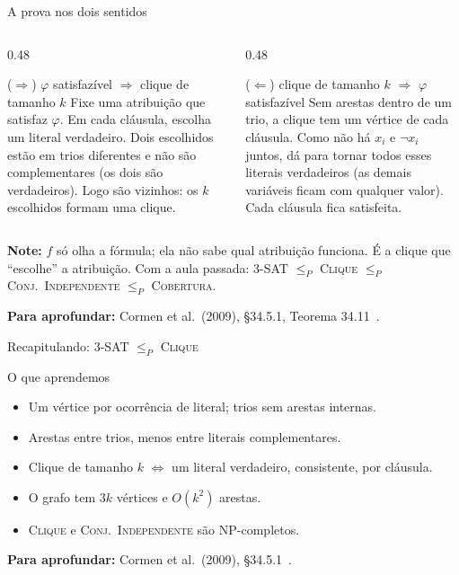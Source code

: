 \documentclass[aspectratio=169,xcolor=table]{beamer}
\newcommand{\fonte}[1]{%
  \vfill
  {\tiny\color{gray!55!black}\textbf{Para aprofundar:} #1\par}%
}
\newcommand{\prob}[1]{\textsc{#1}}
\newcommand{\nao}{\lnot}
\begin{document}
\begin{frame}{A prova nos dois sentidos}
  \begin{columns}[T]
    \begin{column}{0.48\textwidth}
      \begin{block}{($\Rightarrow$) $\varphi$ satisfazível $\Rightarrow$ clique de tamanho $k$}
        \scriptsize
        Fixe uma atribuição que satisfaz $\varphi$. Em cada cláusula, escolha um literal
        verdadeiro. Dois escolhidos estão em trios diferentes e não são complementares (os dois
        são verdadeiros). Logo são vizinhos: os $k$ escolhidos formam uma clique.
      \end{block}
    \end{column}
    \begin{column}{0.48\textwidth}
      \begin{block}{($\Leftarrow$) clique de tamanho $k$ $\Rightarrow$ $\varphi$ satisfazível}
        \scriptsize
        Sem arestas dentro de um trio, a clique tem um vértice de cada cláusula. Como não há
        $x_i$ e $\nao x_i$ juntos, dá para tornar todos esses literais verdadeiros (as demais
        variáveis ficam com qualquer valor). Cada cláusula fica satisfeita.
      \end{block}
    \end{column}
  \end{columns}
  \medskip
  \scriptsize
  \textbf{Note:} $f$ só olha a fórmula; ela não sabe qual atribuição funciona. É a clique que
  ``escolhe'' a atribuição. Com a aula passada: \prob{3-SAT} $\le_P$ \prob{Clique} $\le_P$
  \prob{Conj.\ Independente} $\le_P$ \prob{Cobertura}.
  \fonte{Cormen et al.\ (2009), \S 34.5.1, Teorema 34.11~\cite{cormen2009introduction}.}
\end{frame}

\begin{frame}{Recapitulando: \prob{3-SAT} $\le_P$ \prob{Clique}}
  \begin{block}{O que aprendemos}
    \begin{itemize}
      \item Um vértice por ocorrência de literal; trios sem arestas internas.
      \item Arestas entre trios, menos entre literais complementares.
      \item Clique de tamanho $k$ $\iff$ um literal verdadeiro, consistente, por cláusula.
      \item O grafo tem $3k$ vértices e $O(k^2)$ arestas.
      \item \prob{Clique} e \prob{Conj.\ Independente} são NP-completos.
    \end{itemize}
  \end{block}
  \fonte{Cormen et al.\ (2009), \S 34.5.1~\cite{cormen2009introduction}.}
\end{frame}
\end{document}
